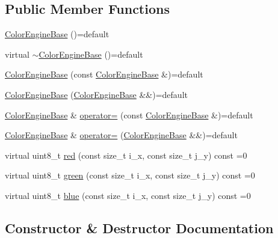 \subsection*{Public Member Functions}
\begin{DoxyCompactItemize}
\item 
\hyperlink{classGraphicalEditorCore_1_1ColorEngineBase_ae9aaf24b0d10206078560352af041058}{Color\+Engine\+Base} ()=default
\item 
virtual \hyperlink{classGraphicalEditorCore_1_1ColorEngineBase_a286d4bf617e3cfa67084e436020cd722}{$\sim$\+Color\+Engine\+Base} ()=default
\item 
\hyperlink{classGraphicalEditorCore_1_1ColorEngineBase_ac101595bae8f49c09446064c47e0c628}{Color\+Engine\+Base} (const \hyperlink{classGraphicalEditorCore_1_1ColorEngineBase}{Color\+Engine\+Base} \&)=default
\item 
\hyperlink{classGraphicalEditorCore_1_1ColorEngineBase_a55df45f8e28e519452b9185ea3c5856d}{Color\+Engine\+Base} (\hyperlink{classGraphicalEditorCore_1_1ColorEngineBase}{Color\+Engine\+Base} \&\&)=default
\item 
\hyperlink{classGraphicalEditorCore_1_1ColorEngineBase}{Color\+Engine\+Base} \& \hyperlink{classGraphicalEditorCore_1_1ColorEngineBase_ac0c10c370c1881f9849969e1a9cbb2c1}{operator=} (const \hyperlink{classGraphicalEditorCore_1_1ColorEngineBase}{Color\+Engine\+Base} \&)=default
\item 
\hyperlink{classGraphicalEditorCore_1_1ColorEngineBase}{Color\+Engine\+Base} \& \hyperlink{classGraphicalEditorCore_1_1ColorEngineBase_a5b9a13ca99cde927d921a78fd00b0fc9}{operator=} (\hyperlink{classGraphicalEditorCore_1_1ColorEngineBase}{Color\+Engine\+Base} \&\&)=default
\item 
virtual uint8\+\_\+t \hyperlink{classGraphicalEditorCore_1_1ColorEngineBase_a9d0b1a48ea117d8f47c43b9c63982dc5}{red} (const size\+\_\+t i\+\_\+x, const size\+\_\+t j\+\_\+y) const =0
\item 
virtual uint8\+\_\+t \hyperlink{classGraphicalEditorCore_1_1ColorEngineBase_a748837e34f2bf4409ae36a5d9ea02e27}{green} (const size\+\_\+t i\+\_\+x, const size\+\_\+t j\+\_\+y) const =0
\item 
virtual uint8\+\_\+t \hyperlink{classGraphicalEditorCore_1_1ColorEngineBase_a86a1c186366f3df9469e36421167f8cb}{blue} (const size\+\_\+t i\+\_\+x, const size\+\_\+t j\+\_\+y) const =0
\end{DoxyCompactItemize}


\subsection{Constructor \& Destructor Documentation}
